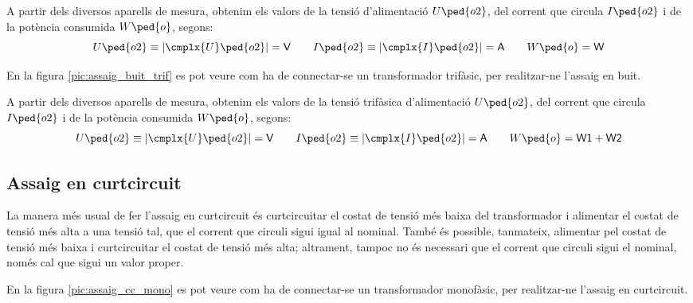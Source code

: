 A partir dels diversos aparells de mesura, obtenim els valors de la
tensió d'alimentació $U\ped{o2}$, del corrent que circula
$I\ped{o2}$ i de la potència consumida $W\ped{o}$, segons:
\begin{equation}
    U\ped{o2}\equiv|\cmplx{U}\ped{o2}|=\textsf{V} \qquad
    I\ped{o2}\equiv|\cmplx{I}\ped{o2}|=\textsf{A}
    \qquad W\ped{o}=\textsf{W}
\end{equation}

En la figura \vref{pic:assaig_buit_trif} es pot veure com ha de
connectar-se un transformador trifàsic, per  realitzar-ne l'assaig en buit.

\begin{center}
    
    \label{pic:assaig_buit_trif}
\end{center}


A partir dels diversos aparells de mesura, obtenim els valors de la
tensió trifàsica d'alimentació $U\ped{o2}$, del corrent que circula
$I\ped{o2}$ i de la potència consumida $W\ped{o}$, segons:
\begin{equation}
    U\ped{o2}\equiv|\cmplx{U}\ped{o2}|=\textsf{V} \qquad
    I\ped{o2}\equiv|\cmplx{I}\ped{o2}|=\textsf{A} \qquad
    W\ped{o}=\textsf{W1}+\textsf{W2}
\end{equation}

\subsection{Assaig en curtcircuit}

La manera més usual de fer l'assaig en curtcircuit és
curtcircuitar el costat de tensió més baixa del transformador i
alimentar el costat de tensió més alta a  una tensió tal, que el corrent
que circuli sigui igual al nominal. També és possible, tanmateix,
alimentar pel costat de  tensió més baixa i curtcircuitar el costat de
 tensió més alta; altrament, tampoc no és necessari que el corrent
que circuli sigui el nominal, només cal que sigui un valor proper.

En la figura \vref{pic:assaig_cc_mono} es pot veure com ha de
connectar-se un transformador monofàsic, per realitzar-ne l'assaig en curtcircuit.


\begin{center}
    
    \label{pic:assaig_cc_mono} \
\end{center}

